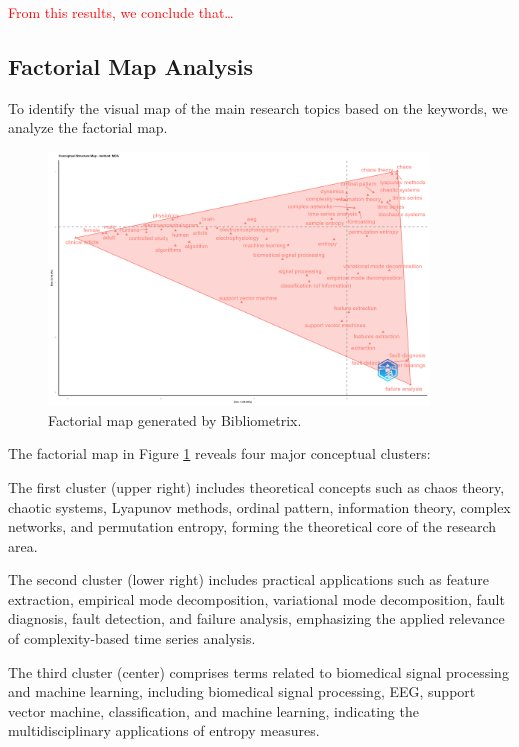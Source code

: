 \textcolor{red}{From this results, we conclude that\dots}

\subsection{Factorial Map Analysis}
To identify the visual map of the main research topics based on the keywords, we analyze the factorial map.

\begin{figure}[H]
	\centering
	\includegraphics[width=0.9\textwidth]{FactorialMap}
	\caption{Factorial map generated by Bibliometrix.}
	\label{fig:factorialMap}
\end{figure}

The factorial map in Figure \ref{fig:factorialMap} reveals four major conceptual clusters:

The first cluster (upper right) includes theoretical concepts such as chaos theory, chaotic systems, Lyapunov methods, ordinal pattern, information theory, complex networks, and permutation entropy, forming the theoretical core of the research area.

The second cluster (lower right) includes practical applications such as feature extraction, empirical mode decomposition, variational mode decomposition, fault diagnosis, fault detection, and failure analysis, emphasizing the applied relevance of complexity-based time series analysis.

The third cluster (center) comprises terms related to biomedical signal processing and machine learning, including biomedical signal processing, EEG, support vector machine, classification, and machine learning, indicating the multidisciplinary applications of entropy measures.

